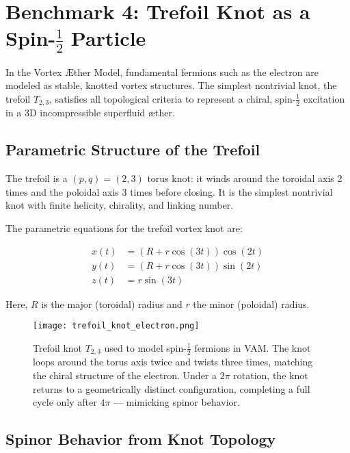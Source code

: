 \section{Benchmark 4: Trefoil Knot as a Spin-\texorpdfstring{$\tfrac{1}{2}$}{1/2} Particle}

In the Vortex Æther Model, fundamental fermions such as the electron are modeled as stable, knotted vortex structures. The simplest nontrivial knot, the trefoil \( T_{2,3} \), satisfies all topological criteria to represent a chiral, spin-\(\tfrac{1}{2}\) excitation in a 3D incompressible superfluid æther.

\subsection{Parametric Structure of the Trefoil}

The trefoil is a \((p, q) = (2, 3)\) torus knot: it winds around the toroidal axis 2 times and the poloidal axis 3 times before closing. It is the simplest nontrivial knot with finite helicity, chirality, and linking number.

The parametric equations for the trefoil vortex knot are:

\begin{equation}
\begin{aligned}
x(t) &= \left(R + r \cos(3t)\right) \cos(2t) \\
y(t) &= \left(R + r \cos(3t)\right) \sin(2t) \\
z(t) &= r \sin(3t)
\end{aligned}
\end{equation}

Here, \(R\) is the major (toroidal) radius and \(r\) the minor (poloidal) radius.

\begin{figure}[H]
    \centering
    \texttt{[image: trefoil\_knot\_electron.png]}
    \caption{Trefoil knot \( T_{2,3} \) used to model spin-\(\tfrac{1}{2}\) fermions in VAM. The knot loops around the torus axis twice and twists three times, matching the chiral structure of the electron. Under a \(2\pi\) rotation, the knot returns to a geometrically distinct configuration, completing a full cycle only after \(4\pi\) — mimicking spinor behavior.}
\end{figure}

\subsection{Spinor Behavior from Knot Topology}

